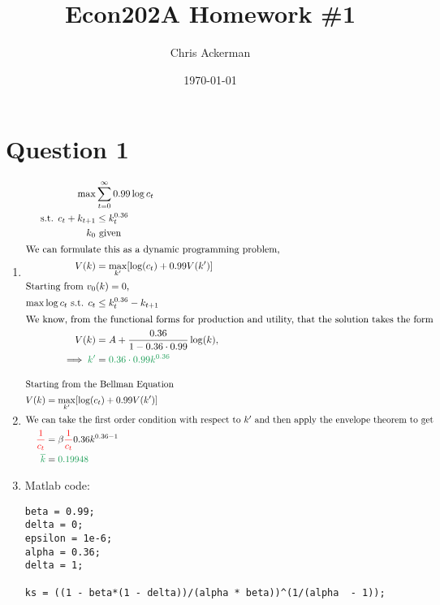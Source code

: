 \documentclass[11pt]{article}
\author{Chris Ackerman}
\date{\today}
\title{Econ202A Homework \#1}
\newcommand{\gr}{\textcolor{ForestGreen}}
\newcommand{\rd}{\textcolor{red}}
\begin{document}
\maketitle
\tableofcontents

\newpage

\section{Question 1}
\label{sec:orgf91538a}

\begin{enumerate}[label=(\alph*)]
\item
\begin{align*}
\max &\sum^\infty_{t = 0} 0.99 \log c_t \\
\text{s.t. } c_t + k_{t + 1} &\le k_t^{0.36}\\
k_0 & \text{ given}\\
\intertext{We can formulate this as a dynamic programming problem,}
V(k) &= \max_{k'} [\log(c_t) + 0.99 V(k')]\\
\intertext{Starting from $v_0(k) = 0$,}
\max \log c_t \text{ s.t. } c_t &\le k^{0.36}_t - k_{t + 1}\\
\intertext{We know, from the functional forms for production and utility, that the solution takes the form}
V(k) &= A + \frac{0.36}{1 - 0.36 \cdot 0.99} \log (k),\\
\implies \gr{k'} &= \gr{0.36 \cdot 0.99 k^{0.36}}
\end{align*}
\item
\begin{align*}
\intertext{Starting from the Bellman Equation}
V(k) &= \max_{k'} [\log(c_t) + 0.99 V(k')]\\
\intertext{We can take the first order condition with respect to $k'$ and then apply the envelope theorem to get}
\rd{\frac{1}{c_t}} &= \beta \rd{\frac{1}{c_t}} 0.36 k^{0.36 - 1}\\
\gr{\overline{k}} &=  \gr{0.19948}
\end{align*}
\newpage
\item Matlab code:
\begin{verbatim}
beta = 0.99;
delta = 0;
epsilon = 1e-6;
alpha = 0.36;
delta = 1;

ks = ((1 - beta*(1 - delta))/(alpha * beta))^(1/(alpha  - 1));


\end{verbatim}
\end{enumerate}
\end{document}
